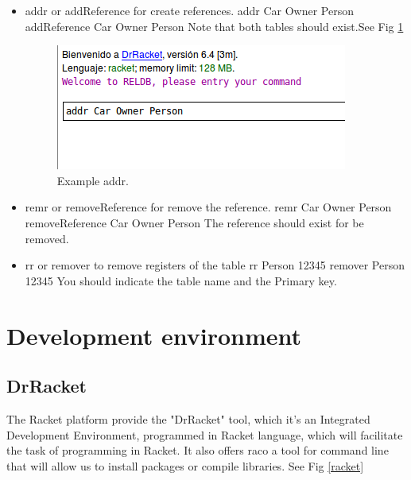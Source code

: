 \documentclass[12pt]{article}
\begin{document}
\begin{itemize}
\begin{itemize}
\item addr or addReference for create references.\newline
addr Car Owner Person \newline
addReference Car Owner Person \newline
Note that both tables should exist.See Fig \ref{addr}
\begin{figure}[h!]
 	\centering
  	\includegraphics[scale=0.5]
  	{Images/3.png}
  	\caption{Example addr.}
     \label{addr}
\end{figure}
\item remr or removeReference for remove the reference. \newline
remr Car Owner Person \newline
removeReference Car Owner Person \newline
The reference should exist for be removed.
\item rr or remover to remove registers of the table\newline
rr Person 12345\newline
remover Person 12345\newline
You should indicate the table name and the Primary key.
\end{itemize}

\section{Development environment}
\subsection{DrRacket}
The Racket platform provide the "DrRacket" tool, which it's an Integrated Development Environment, programmed in Racket language, which will facilitate the task of programming in Racket. It also offers raco a tool for command line that will allow us to install packages or compile libraries. See Fig \ref{racket}


\end{itemize}
\end{document}
